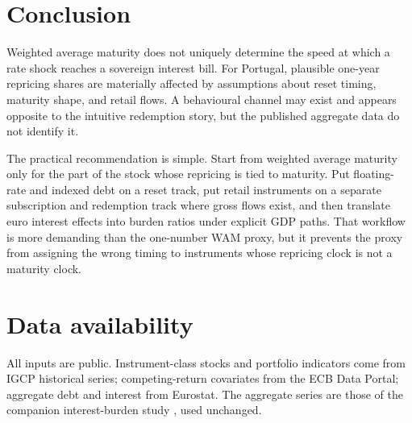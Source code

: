 \documentclass[11pt,a4paper]{article}
\begin{document}
\section{Conclusion}
\label{sec:conclusion}

Weighted average maturity does not uniquely determine the speed at which a rate
shock reaches a sovereign interest bill. For Portugal, plausible one-year
repricing shares are materially affected by assumptions about reset timing,
maturity shape, and retail flows. A behavioural channel may exist and appears
opposite to the intuitive redemption story, but the published aggregate data do
not identify it.

The practical recommendation is simple. Start from weighted average maturity
only for the part of the stock whose repricing is tied to maturity. Put
floating-rate and indexed debt on a reset track, put retail instruments on a
separate subscription and redemption track where gross flows exist, and then
translate euro interest effects into burden ratios under explicit GDP paths.
That workflow is more demanding than the one-number WAM proxy, but it prevents
the proxy from assigning the wrong timing to instruments whose repricing clock
is not a maturity clock.

\section*{Data availability}

All inputs are public. Instrument-class stocks and portfolio indicators come
from IGCP historical series; competing-return covariates from the ECB Data
Portal; aggregate debt and interest from Eurostat. The aggregate series are
those of the companion interest-burden study \cite{ribeiro_burden}, used
unchanged.
\end{document}

